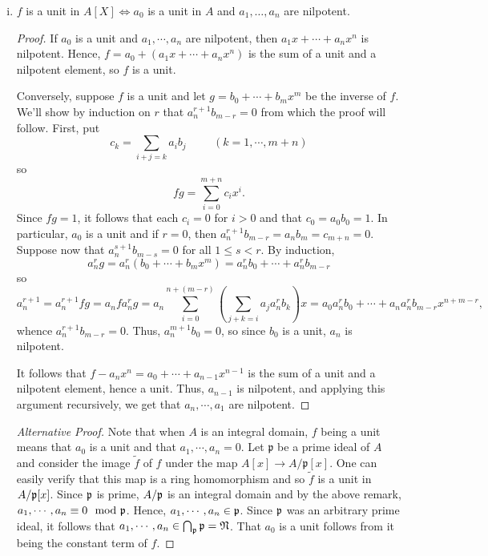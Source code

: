 \begin{enumerate}[i)]
    \item $f$ is a unit in $A[X] \Leftrightarrow a_0$ is a unit in $A$ and $a_1,\dots, a_n$ are nilpotent.
        \begin{proof}
            If $a_0$ is a unit and $a_1,\cdots, a_n$ are nilpotent, then $a_1x + \cdots + a_nx^n$ is nilpotent.
            Hence, $f = a_0 + (a_1x + \cdots + a_nx^n)$ is the sum of a unit and a nilpotent element, so $f$ is a unit.

            Conversely, suppose $f$ is a unit and let $g = b_0 + \cdots + b_mx^m$ be the inverse of $f$.
            We'll show by induction on $r$ that $a_n^{r+1}b_{m-r} = 0$ from which the proof will follow.
            First, put $$c_k = \sum_{i+j = k}a_ib_j \hspace{1cm}(k = 1, \cdots, m+n)$$
            so \[
                fg = \sum_{i=0}^{m+n}c_ix^i.
            \]
            Since $fg = 1$, it follows that each $c_i = 0$ for $i > 0$ and that $c_0 = a_0b_0 = 1$.
            In particular, $a_0$ is a unit and if $r = 0$, then $a_n^{r+1}b_{m-r} = a_nb_m = c_{m+n} = 0$. 
            Suppose now that $a_n^{s+1}b_{m-s} = 0$ for all $1 \leq s < r$.
            By induction, \[
                a_n^rg = a_n^r(b_0 + \cdots + b_mx^m) = a_n^rb_0 + \cdots + a_n^rb_{m-r}
            \]
            so \[
                a_n^{r+1} = a_n^{r+1}fg = a_nfa_n^rg = a_n\sum_{i=0}^{n+(m-r)}(\sum_{j+k = i}a_ja_n^rb_k)x = a_0a_n^rb_0 + \cdots + a_na_n^rb_{m-r}x^{n+m-r},
            \]
            whence $a_n^{r+1}b_{m-r} = 0$.
            Thus, $a_n^{m+1}b_0 = 0$, so since $b_0$ is a unit, $a_n$ is nilpotent.

            It follows that $f - a_nx^n = a_0 + \cdots + a_{n-1}x^{n-1}$ is the sum of a unit and a nilpotent element, hence a unit.
            Thus, $a_{n-1}$ is nilpotent, and applying this argument recursively, we get that $a_n, \cdots, a_1$ are nilpotent.
        \end{proof}

        \begin{proof}[Alternative Proof]
            Note that when $A$ is an integral domain, $f$ being a unit means that $a_0$ is a unit and that $a_1, \cdots, a_n = 0$.
            Let $\mathfrak{p}$ be a prime ideal of $A$ and consider the image $\tilde{f}$ of $f$ under the map $A[x] \to A/\mathfrak{p}[x]$.
            One can easily verify that this map is a ring homomorphism and so $\tilde{f}$ is a unit in $A/\frak{p}[x]$.
            Since $\frak{p}$ is prime, $A/\frak{p}$ is an integral domain and by the above remark, $a_1, \cdots, a_n \equiv 0 \mod \frak p$.
            Hence, $a_1, \cdots, a_n \in \frak p$.
            Since $\frak p$ was an arbitrary prime ideal, it follows that $a_1, \cdots, a_n \in \bigcap_{\frak p}\frak p = \nilradical$.
            That $a_0$ is a unit follows from it being the constant term of $f$.
        \end{proof}
        

\end{enumerate}
